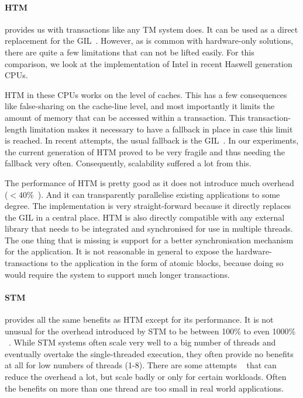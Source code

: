 \documentclass{sigplanconf}
\begin{document}
\paragraph{HTM} provides us with transactions like any TM system does.
It can be used as a direct replacement for the GIL~\cite{nicholas06,odaira14,fuad10}. However, as is
common with hardware-only solutions, there are quite a few limitations
that can not be lifted easily. For this comparison, we look at the
implementation of Intel in recent Haswell generation CPUs.

HTM in these CPUs works on the level of caches. This has a few
consequences like false-sharing on the cache-line level, and most
importantly it limits the amount of memory that can be accessed within
a transaction. This transaction-length limitation makes it necessary
to have a fallback in place in case this limit is reached. In recent
attempts, the usual fallback is the GIL~\cite{odaira14,fuad10}. In our
experiments, the current generation of HTM proved to be very fragile
and thus needing the fallback very often. Consequently, scalability
suffered a lot from this.

The performance of HTM is pretty good as it does not introduce much
overhead ($<40\%$~\cite{odaira14}). And it can transparently
parallelise existing applications to some degree. The implementation
is very straight-forward because it directly replaces the GIL in a
central place. HTM is also directly compatible with any external
library that needs to be integrated and synchronised for use in
multiple threads. The one thing that is missing is support for a
better synchronisation mechanism for the application. It is not
reasonable in general to expose the hardware-transactions to the
application in the form of atomic blocks, because doing so would
require the system to support much longer transactions.


\paragraph{STM} provides all the same benefits as HTM except for its
performance.  It is not unusual for the overhead introduced by STM to
be between 100\% to even 1000\% ~\cite{cascaval08,drago11}. While STM
systems often scale very well to a big number of threads and
eventually overtake the single-threaded execution, they often provide
no benefits at all for low numbers of threads (1-8). There are some
attempts ~\cite{warmhoff13,spear09} that can reduce the overhead a lot,
but scale badly or only for certain workloads. Often the benefits
on more than one thread are too small in real world applications.
\end{document}
